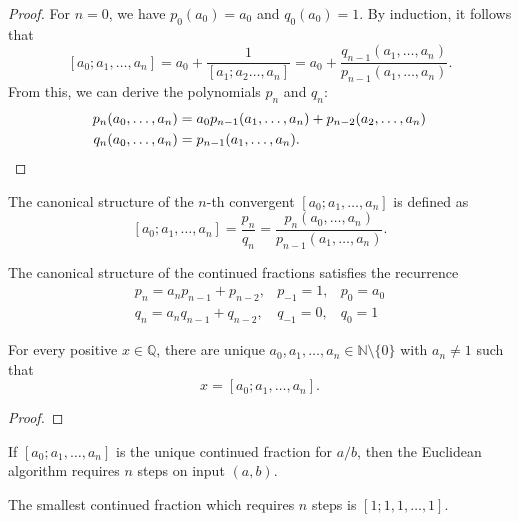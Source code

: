 \documentclass[english,version-2020-11]{uzl-thesis}
\newcommand\N{{\mathbb N}}
\newcommand\Q{{\mathbb Q}}
\begin{document}
\begin{proof}
  For $n = 0$, we have $p_0(a_0) = a_0$ and $q_0(a_0) = 1$.
  By induction, it follows that
  \[
    [a_0; a_1, \dots, a_n] = a_0 + \frac{1}{[a_1; a_2 \dots, a_n]} = a_0 + \frac{q_{n-1}(a_1, \dots, a_n)}{p_{n-1}(a_1, \dots, a_n)}.
  \]
  From this, we can derive the polynomials $p_n$ and $q_n$:
  \begin{align*}
    p_n(a_0, \dots, a_n) & = a_0 p_{n-1}(a_1, \dots, a_n) + p_{n-2}(a_2, \dots, a_n) \\
    q_n(a_0, \dots, a_n) & = p_{n-1}(a_1, \dots, a_n). \qedhere
  \end{align*}
\end{proof}

\begin{definition}
  The canonical structure of the $n$-th convergent $[a_0; a_1, \dots, a_n]$ is defined as
  \[
    [a_0; a_1, \dots, a_n] = \frac{p_n}{q_n} = \frac{p_n(a_0, \dots, a_n)}{p_{n-1}(a_1, \dots, a_n)}.
  \]
\end{definition}

\begin{lemma}
  The canonical structure of the continued fractions satisfies the recurrence
  \[
    \begin{matrix}
      p_n = a_n p_{n-1} + p_{n-2}, & p_{-1} = 1, & p_0 = a_0 \\
      q_n = a_n q_{n-1} + q_{n-2}, & q_{-1} = 0, & q_0 = 1
    \end{matrix}
  \]
\end{lemma}

\begin{lemma}
  For every positive $x \in \Q$, there are unique
  $a_0, a_1, \dots, a_n \in \N \setminus \{0\}$ with $a_n \ne 1$
  such that
  \[
    x = [a_0; a_1, \dots, a_n].
  \]
\end{lemma}

\begin{proof}

\end{proof}

\begin{lemma}
  If $[a_0; a_1, \dots, a_n]$ is the unique continued fraction for $a/b$,
  then the Euclidean algorithm requires $n$ steps on input $(a, b)$.
\end{lemma}

\begin{lemma}
  The smallest continued fraction which requires $n$ steps is $[1; 1, 1, \dots, 1]$.
\end{lemma}
\end{document}
